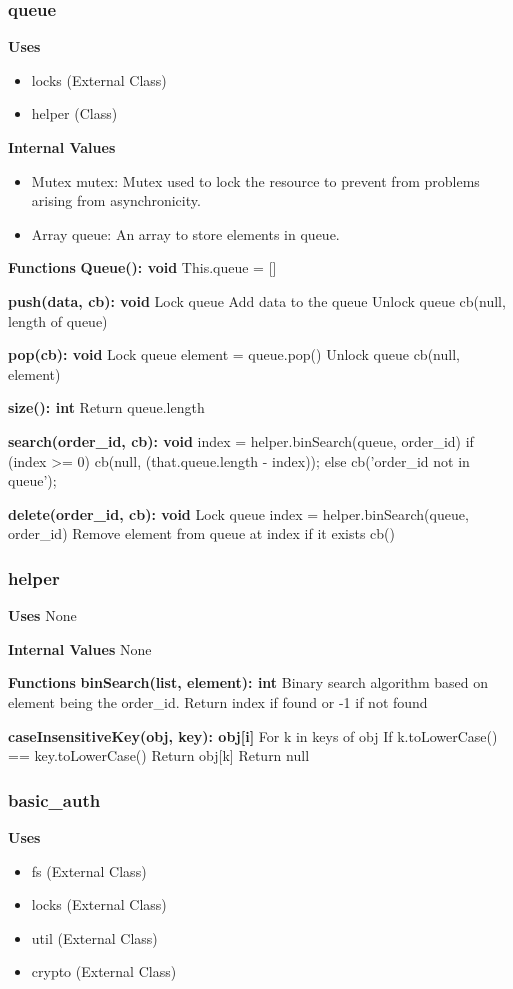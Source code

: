 \documentclass [10pt]{article}
\begin{document}
\subsubsection{queue}
\textbf{Uses}
\begin{itemize}
	\item locks (External Class)
	\item helper (Class)
\end{itemize}

\textbf{Internal Values}
\begin{itemize}
	\item Mutex mutex: Mutex used to lock the resource to prevent from problems arising from asynchronicity.
	\item Array queue: An array to store elements in queue.
\end{itemize}

\textbf{Functions}
\textbf{Queue(): void}
This.queue = []

\textbf{push(data, cb): void}
Lock queue
Add data to the queue
Unlock queue
cb(null, length of queue)

\textbf{pop(cb): void}
Lock queue
element = queue.pop()
Unlock queue
cb(null, element)

\textbf{size(): int}
Return queue.length

\textbf{search(order\_id, cb): void}
index = helper.binSearch(queue, order\_id)
if (index >= 0) {
	cb(null, (that.queue.length - index));
} else {
	cb('order\_id not in queue');
}

\textbf{delete(order\_id, cb): void}
Lock queue
index = helper.binSearch(queue, order\_id)
Remove element from queue at index if it exists
cb()

\subsubsection{helper}
\textbf{Uses}
None

\textbf{Internal Values}
None

\textbf{Functions}
\textbf{binSearch(list, element): int}
Binary search algorithm based on element being the order\_id.
Return index if found or -1 if not found

\textbf{caseInsensitiveKey(obj, key): obj[i]}
For k in keys of obj
	If k.toLowerCase() == key.toLowerCase()
		Return obj[k]
Return null

\subsubsection{basic\_auth}
\textbf{Uses}
\begin{itemize}
	\item fs (External Class)
	\item locks (External Class)
	\item util (External Class)
	\item crypto (External Class)
\end{itemize}
\end{document}
